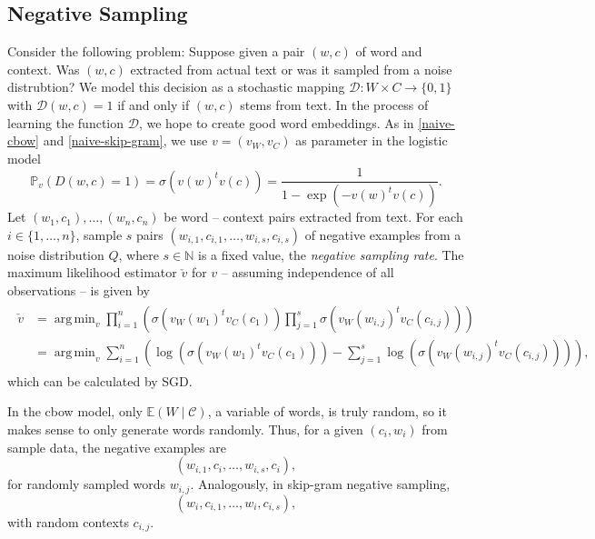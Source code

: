\documentclass{amsart}
\theoremstyle{plain}
\theoremstyle{definition}
\newcommand{\N}{\mathbb{N}}
\renewcommand{\P}{\mathbb{P}}
\newcommand{\E}{\mathbb{E}}
\DeclareMathOperator*{\argmin}{arg\,min}
\begin{document}
\subsection{Negative Sampling}
Consider the following problem:
Suppose given a pair $(w, c)$ of word and context.
Was $(w, c)$ extracted from actual text or was it sampled from a noise distrubtion?
We model this decision as a stochastic mapping $\mathcal{D} : W \times C \rightarrow \{0, 1\}$ with $\mathcal{D}(w, c) = 1$ if and only if $(w, c)$ stems from text.
In the process of learning the function $\mathcal{D}$, we hope to create good word embeddings.
As in \ref{naive-cbow} and \ref{naive-skip-gram}, we use $v = (v_W, v_C)$ as parameter in the logistic model
\begin{equation}
  \P_v(D(w, c) = 1) = \sigma(v(w)^t v(c)) = \frac{1}{1 - \exp(-v(w)^t v(c))}.
\end{equation}
Let $(w_1, c_1), \dots, (w_n, c_n)$ be word -- context pairs extracted from text.
For each $i \in \{1, \dots, n\}$, sample $s$ pairs $(w_{i, 1}, c_{i, 1}, \dots, w_{i, s}, c_{i, s})$ of negative examples from a noise distribution $Q$, where $s \in \N$ is a fixed value, the \emph{negative sampling rate}.
The maximum likelihood estimator $\check v$ for $v$ -- assuming independence of all observations -- is given by
\begin{align}
  \label{eq:ns-estimator}
  \begin{split}
    \check v & = \argmin_v \prod_{i=1}^n \left( \sigma(v_W(w_1)^t v_C(c_1)) \prod_{j = 1}^s \sigma(v_W(w_{i, j})^t v_C(c_{i, j})) \right) \\
             & = \argmin_v \sum_{i=1}^n \left( \log \left(\sigma(v_W(w_1)^t v_C(c_1)) \right) - \sum_{j = 1}^s \log \left( \sigma(v_W(w_{i, j})^t v_C(c_{i, j})) \right) \right),
  \end{split}
\end{align}
which can be calculated by SGD.

In the cbow model, only $\E(W \mid \mathcal{C})$, a variable of words, is truly random, so it makes sense to only generate words randomly.
Thus, for a given $(c_i, w_i)$ from sample data, the negative examples are
\begin{equation*}
  (w_{i, 1}, c_i, \dots, w_{i, s}, c_i),
\end{equation*}
for randomly sampled words $w_{i, j}$.
Analogously, in skip-gram negative sampling,
\begin{equation*}
  (w_i, c_{i, 1}, \dots, w_i, c_{i, s}),
\end{equation*}
with random contexts $c_{i, j}$.
\end{document}
